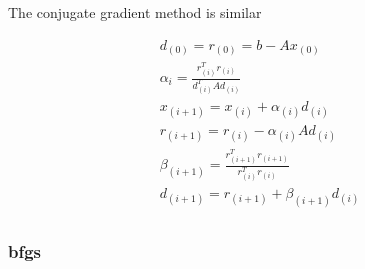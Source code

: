 The conjugate gradient method is similar

\begin{equation}
  \begin{split}
  d_{(0)} = r_{(0)} = b - A x_{(0)} \\  
  \alpha_{i} = \frac{r^{T}_{(i)} r_{(i)}}{d^{T}_{(i)} A d_{(i)}} \\
  x_{(i+1)} = x_{(i)} + \alpha_{(i)} d_{(i)} \\
  r_{(i+1)} = r_{(i)} - \alpha_{(i)} A d_{(i)} \\
  \beta_{(i+1)} = \frac{r^{T}_{(i+1)} r_{(i+1)}} {r^{T}_{(i)} r_{(i)}} \\
  d_{(i + 1)} = r_{(i + 1)} + \beta_{(i+1)} d_{(i)}\\
  \end{split}
  \label{eq:conjugategradient}
\end{equation}


\subsubsection{\acrfull{bfgs}}
